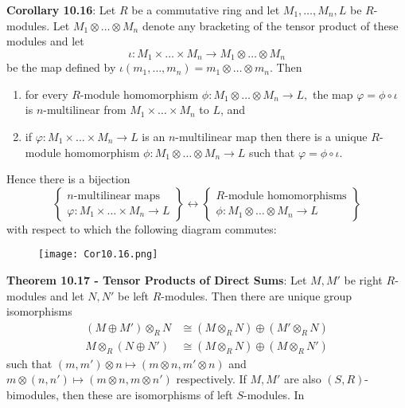 \documentclass{article}
\begin{document}
\textbf{Corollary 10.16}: Let $R$ be a commutative ring and let $M_1, \dots, M_n, L$ be $R$-modules. Let $M_1 \otimes \dots \otimes M_n$ denote any bracketing of the tensor product of these modules and let $$\iota: M_1 \times \dots \times M_n \rightarrow M_1 \otimes \dots \otimes M_n$$ be the map defined by $\iota(m_1, \dots, m_n) = m_1 \otimes \dots \otimes m_n$. Then \begin{enumerate}
    \item for every $R$-module homomorphism $\phi: M_1 \otimes \dots \otimes M_n \rightarrow L,$ the map $\varphi = \phi \circ \iota$ is $n$-multilinear from $M_1 \times \dots \times M_n$ to $L$, and
    \item if $\varphi: M_1 \times \dots \times M_n \rightarrow L$ is an $n$-multilinear map then there is a unique $R$-module homomorphism $\phi: M_1 \otimes \dots \otimes M_n \rightarrow L$ such that $\varphi = \phi \circ \iota.$
\end{enumerate} Hence there is a bijection $$\begin{Bmatrix}
    n\text{-multilinear maps} \\
    \varphi: M_1 \times \dots \times M_n \rightarrow L
\end{Bmatrix} \leftrightarrow \begin{Bmatrix}
    R\text{-module homomorphisms} \\
    \phi: M_1 \otimes \dots \otimes M_n \rightarrow L
\end{Bmatrix}$$ with respect to which the following diagram commutes: \vspace{-2mm} \begin{figure}[H]
\begin{center}
\texttt{[image: Cor10.16.png]}
\end{center}
\end{figure} \vspace{-5mm}
\noindent \textbf{Theorem 10.17 - Tensor Products of Direct Sums}: Let $M, M'$ be right $R$-modules and let $N, N'$ be left $R$-modules. Then there are unique group isomorphisms \begin{align*}
    (M \oplus M') \otimes_R N &\cong (M \otimes_R N) \oplus (M' \otimes_R N) \\
    M \otimes_R (N \oplus N') &\cong (M \otimes_R N) \oplus (M \otimes_R N')
\end{align*} such that $(m, m') \otimes n \mapsto (m \otimes n, m' \otimes n)$ and $m \otimes (n, n') \mapsto (m \otimes n, m \otimes n')$ respectively. If $M, M'$ are also $(S, R)$-bimodules, then these are isomorphisms of left $S$-modules. In
\end{document}

